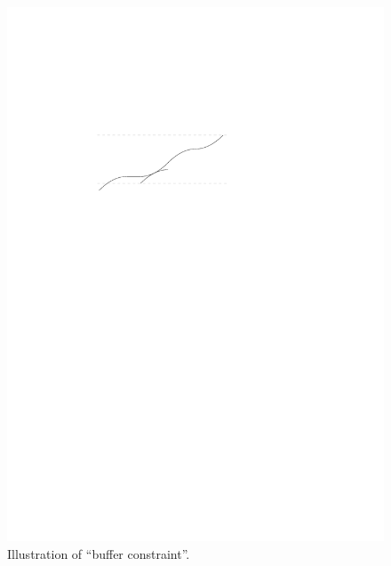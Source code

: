 \documentclass[a4paper]{article}
\theoremstyle{definition}
\theoremstyle{plain}
\begin{document}
\begin{figure}
  \centering
  \includegraphics[scale=1]{figures/motion/rough/bufferconstraint}
  \caption{Illustration of ``buffer constraint''.}%
  \label{fig:bufferconstraint}
\end{figure}
\end{document}
